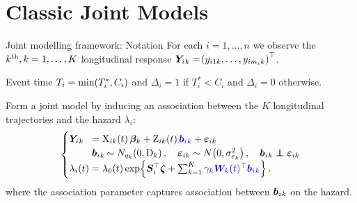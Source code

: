 \documentclass[10pt]{beamer}
\begin{document}
\section{Classic Joint Models}
\begin{frame}{Joint modelling framework: Notation}
For each $i=1,\ldots,n$ we observe the $k^{\text{th}}, k=1,\ldots,K$ longitudinal response $\bm{Y}_i{_k}=\!\left( y_{i1k},\ldots,y_{i{m_i}k}\right)^\top$.\\

\vspace*{2mm}

Event time $T_i=\min\!\left( T_i^*, C_i\right)$ and $\Delta_i=1$ if $T_i^*<C_i$ and $\Delta_i=0$ otherwise.\\

\vspace*{2mm}

Form a joint model by inducing an association between the $K$ longitudinal trajectories and the hazard $\lambda_i$:
  \begin{equation*}
    \begin{aligned}
    \begin{cases}
      \Y{_k} &\!\!\!\!\!\!\!\!\!\!\!\!\!\!= \X_{ik}\lb t\rb\bb_{k} + \Z_{ik}\lb t\rb\textblue{\b{_k}} + \bm{\varepsilon}_{ik}\\
      \ \ \ \ \ \ \ \b{_k} &\!\!\!\!\!\sim N_{q_k}\lb 0, \mathrm{D}_k\rb, \quad \bm{\varepsilon}_{ik}\sim N\lb0, \sigma^2_{\varepsilon_k}\rb,\quad \b{_k}\indep\bm{\varepsilon}_{ik}\\
      \lambda_i(t)&\!\!\!\!\!\!\!\!\!\!\!\!\!\!=\lambda_0(t)\exp\lbr\bm{S}_i^\top\bm{\zeta} + \Sk\textblue{\gamma_k\bm{W}_k(t)^\top\b{_k}}\rbr.  
    \end{cases}
    \end{aligned}
  \label{eq:methods-lmm}
  \end{equation*}
  where the association parameter  captures association between  $\bm{b}_i{_k}$ on the hazard.
    
\end{frame}
\end{document}
